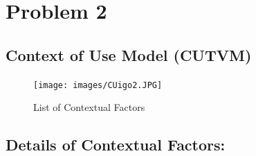 \documentclass[11pt,oneside]{book}
\begin{document}
\chapter{Problem 2}
\section{Context of Use Model (CUTVM)}

\begin{figure}[htp]
\begin{center}
\texttt{[image: images/CUigo2.JPG]}
      \centering
    \caption{List of Contextual Factors }
\end{center}
  
\end{figure}
\newpage

\section{Details of Contextual Factors:}
\end{document}
